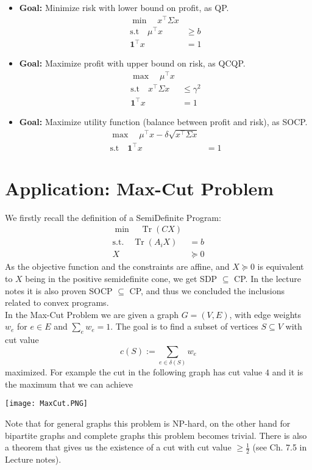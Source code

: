 \documentclass[answers]{exam}
\begin{document}
    \begin{itemize}
        \item \textbf{Goal:} Minimize risk with lower bound on profit, as QP.
        \begin{align*}
            \min\quad x^\top \Sigma x& \\ 
            \text{s.t}\quad \mu^\top x&\geq b \\ 
            \textbf{1}^\top x &= 1 
        \end{align*}
        \item \textbf{Goal:} Maximize profit with upper bound on risk, as QCQP.
        \begin{align*}
            \max\quad \mu^\top x& \\ 
            \text{s.t}\quad x^\top \Sigma x&\leq \gamma^2 \\ 
            \textbf{1}^\top x &= 1 
        \end{align*}
        \item \textbf{Goal:} Maximize utility function (balance between profit and risk), as SOCP.
        \begin{align*}
            \max\quad \mu^\top x - \delta \sqrt{x^\top \Sigma x}& \\ 
            \text{s.t}\quad \textbf{1}^\top x &= 1 
        \end{align*}
    \end{itemize}

\section{Application: Max-Cut Problem}
    We firstly recall the definition of a SemiDefinite Program:
    \begin{align*}
        \min\quad \operatorname{Tr}(CX)& \\ 
        \text{s.t.}\quad \operatorname{Tr}(A_iX)& = b \\ 
        X&\succeq 0
    \end{align*}
    As the objective function and the constraints are affine, and $X\succeq 0$ is equivalent to $X$ being in the positive semidefinite cone, we get SDP $\subseteq$ CP. In the lecture notes it is also proven SOCP $\subseteq$ CP, and thus we concluded the inclusions related to convex programs.\\

    In the Max-Cut Problem we are given a graph $G=(V,E)$, with edge weights $w_e$ for $e\in E$ and $\sum_{e} w_e = 1$. The goal is to find a subset of vertices $S\subseteq V$ with cut value 
    $$ c(S) := \sum_{e\in \delta(S)} w_e $$
    maximized. For example the cut in the following graph has cut value $4$ and it is the maximum that we can achieve
    \begin{center}
        \texttt{[image: MaxCut.PNG]}
    \end{center}
    Note that for general graphs this problem is NP-hard, on the other hand for bipartite graphs and complete graphs this problem becomes trivial. There is also a theorem that gives us the existence of a cut with cut value $ \geq \tfrac{1}{2}$ (see Ch. 7.5 in Lecture notes). 
\end{document}
